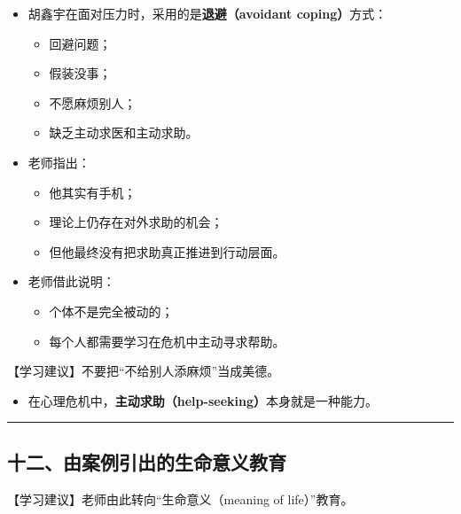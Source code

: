 \documentclass[
  chinese,
  9pt,
  a4paper,
]{ctexart}
\providecommand{\tightlist}{%
  \setlength{\itemsep}{0pt}\setlength{\parskip}{0pt}}
\begin{document}
\begin{itemize}
\item
  胡鑫宇在面对压力时，采用的是\textbf{退避（avoidant coping）}方式：

  \begin{itemize}
  \tightlist
  \item
    回避问题；
  \item
    假装没事；
  \item
    不愿麻烦别人；
  \item
    缺乏主动求医和主动求助。
  \end{itemize}
\item
  老师指出：

  \begin{itemize}
  \tightlist
  \item
    他其实有手机；
  \item
    理论上仍存在对外求助的机会；
  \item
    但他最终没有把求助真正推进到行动层面。
  \end{itemize}
\item
  老师借此说明：

  \begin{itemize}
  \tightlist
  \item
    个体不是完全被动的；
  \item
    每个人都需要学习在危机中主动寻求帮助。
  \end{itemize}
\end{itemize}

【学习建议】不要把``不给别人添麻烦''当成美德。

\begin{itemize}
\tightlist
\item
  在心理危机中，\textbf{主动求助（help-seeking）}本身就是一种能力。
\end{itemize}

\begin{center}\rule{0.5\linewidth}{0.5pt}\end{center}

\subsection{十二、由案例引出的生命意义教育}\label{ux5341ux4e8cux7531ux6848ux4f8bux5f15ux51faux7684ux751fux547dux610fux4e49ux6559ux80b2}

【学习建议】老师由此转向``生命意义（meaning of life）''教育。
\end{document}
